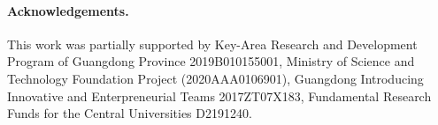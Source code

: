 \documentclass[10pt,twocolumn,letterpaper]{article}
\begin{document}
\paragraph{Acknowledgements.} This work was partially supported by Key-Area Research and Development Program of Guangdong Province 2019B010155001, Ministry of Science and Technology Foundation Project (2020AAA0106901), Guangdong Introducing Innovative and Enterpreneurial Teams 2017ZT07X183, Fundamental Research Funds for the Central Universities D2191240.
\clearpage

{\small


}
\clearpage









\end{document}
